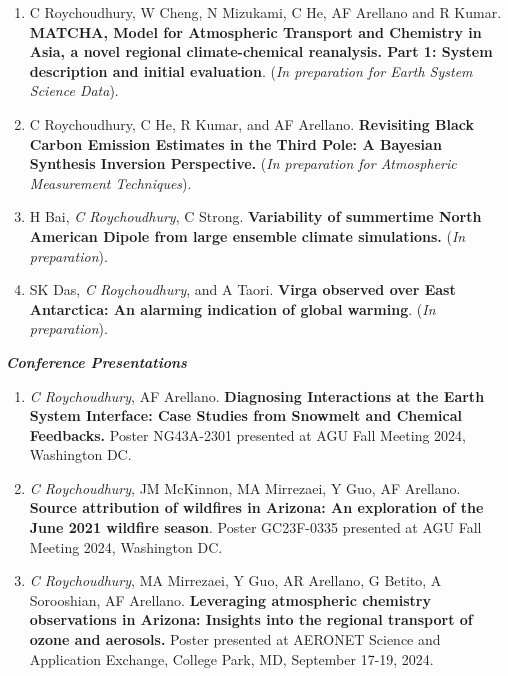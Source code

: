 \documentclass[margin,line]{resume}
\begin{document}
\begin{resume}
\begin{enumerate}[topsep=1pt, partopsep=1pt, itemsep=0.5pt, parsep=0.1pt, leftmargin=15pt,label=\arabic*.]
			\item C Roychoudhury, W Cheng, N Mizukami, C He, AF Arellano and R Kumar. \textbf{MATCHA, Model for Atmospheric Transport and Chemistry in Asia, a novel regional climate-chemical reanalysis. Part 1: System description and initial evaluation}. (\textit{In preparation for Earth System Science Data}).
			
			\item C Roychoudhury, C He, R Kumar, and AF Arellano. \textbf{Revisiting Black Carbon Emission Estimates in the Third Pole: A
				Bayesian Synthesis Inversion Perspective.} (\textit{In preparation for Atmospheric Measurement Techniques}).
			
			
			\item H Bai, \textit{C Roychoudhury}, C Strong. \textbf{Variability of summertime North American Dipole from large ensemble climate simulations.} (\emph{In preparation}).
			
			\item SK Das, \textit{C Roychoudhury}, and A Taori.
			\textbf{Virga observed over East Antarctica: An alarming indication of global warming}. (\emph{In preparation}).
			
			
		\end{enumerate}
		
	
	\textbf{\emph{\textcolor{sep}{Conference Presentations}}}
		\begin{enumerate}[topsep=1pt, partopsep=1pt, itemsep=0.5pt, parsep=0.1pt, leftmargin=15pt,label=\arabic*.]
			
			\item \textit{C Roychoudhury}, AF Arellano. \textbf{Diagnosing Interactions at the Earth System Interface: Case Studies from Snowmelt and Chemical Feedbacks.} Poster NG43A-2301 presented at AGU Fall Meeting 2024, Washington DC. 
			
			\item \textit{C Roychoudhury}, JM McKinnon, MA Mirrezaei, Y Guo, AF Arellano. \textbf{Source attribution of wildfires in Arizona: An exploration of the June 2021 wildfire season}. Poster GC23F-0335 presented at AGU Fall Meeting 2024, Washington DC. 
			
			\item \textit{C Roychoudhury}, MA Mirrezaei, Y Guo, AR Arellano, G Betito, A Sorooshian, AF Arellano.  \textbf{Leveraging atmospheric chemistry observations in Arizona: Insights into the regional transport of ozone and aerosols.} Poster presented at AERONET Science and Application Exchange, College Park, MD, September 17-19, 2024.
			

\end{enumerate}
\end{resume}
\end{document}
